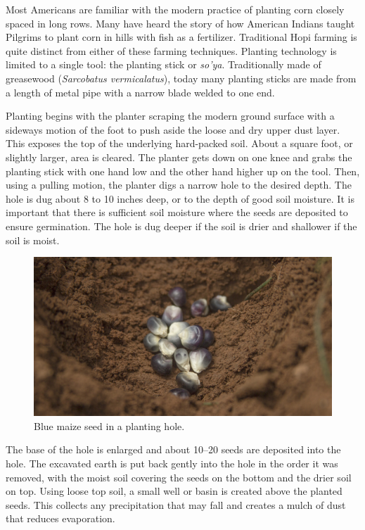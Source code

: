 \documentclass[12pt,]{article}
\begin{document}
Most Americans are familiar with the modern practice of planting corn closely spaced in long rows. Many have heard the story of how American Indians taught Pilgrims to plant corn in hills with fish as a fertilizer. Traditional Hopi farming is quite distinct from either of these farming techniques. Planting technology is limited to a single tool: the planting stick or \emph{so'ya}. Traditionally made of greasewood (\emph{Sarcobatus vermicalatus}), today many planting sticks are made from a length of metal pipe with a narrow blade welded to one end.

Planting begins with the planter scraping the modern ground surface with a sideways motion of the foot to push aside the loose and dry upper dust layer. This exposes the top of the underlying hard-packed soil. About a square foot, or slightly larger, area is cleared. The planter gets down on one knee and grabs the planting stick with one hand low and the other hand higher up on the tool. Then, using a pulling motion, the planter digs a narrow hole to the desired depth. The hole is dug about 8 to 10 inches deep, or to the depth of good soil moisture. It is important that there is sufficient soil moisture where the seeds are deposited to ensure germination. The hole is dug deeper if the soil is drier and shallower if the soil is moist.

\begin{figure}
\centering
\includegraphics{./images/chapter_6_planting.jpg}
\caption{Blue maize seed in a planting hole.}
\end{figure}

The base of the hole is enlarged and about 10--20 seeds are deposited into the hole. The excavated earth is put back gently into the hole in the order it was removed, with the moist soil covering the seeds on the bottom and the drier soil on top. Using loose top soil, a small well or basin is created above the planted seeds. This collects any precipitation that may fall and creates a mulch of dust that reduces evaporation.
\end{document}
